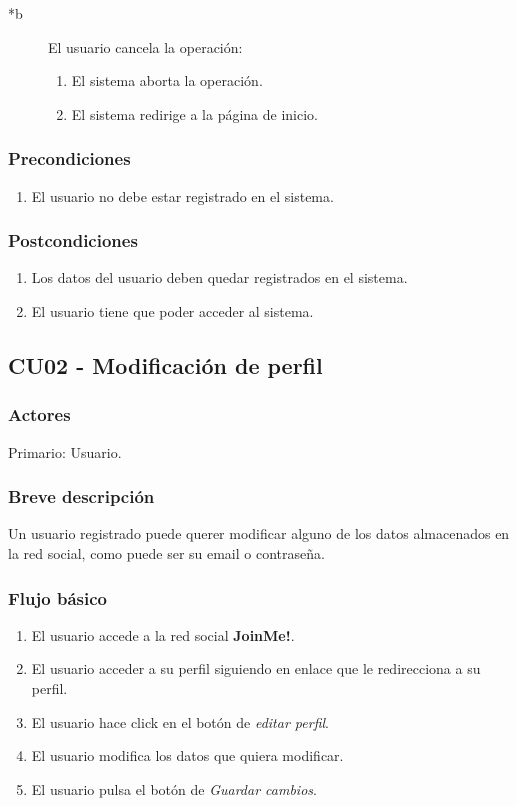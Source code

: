 \documentclass[12pt, a4paper, titlepage]{article}
\begin{document}
\begin{description}
	\item [*b] El usuario cancela la operación:
	\begin{enumerate}
		\item El sistema aborta la operación.
		\item El sistema redirige a la página de inicio.
	\end{enumerate}
\end{description}

\subsubsection{Precondiciones}
\begin{enumerate}
	\item El usuario no debe estar registrado en el sistema.
\end{enumerate}
\subsubsection{Postcondiciones}
\begin{enumerate}
	\item Los datos del usuario deben quedar registrados en el sistema.
	\item El usuario tiene que poder acceder al sistema.
\end{enumerate}


\subsection{CU02 - Modificación de perfil}
\subsubsection{Actores}

Primario: Usuario.

\subsubsection{Breve descripción}
Un usuario registrado puede querer modificar alguno de los datos almacenados en la red social, como puede ser su email o contraseña.

\subsubsection{Flujo básico}
	\begin{enumerate}
		\item El usuario accede a la red social \textbf{JoinMe!}.
		\item El usuario acceder a su perfil siguiendo en enlace que le redirecciona a su perfil. 
		\item El usuario hace click en el botón de \textit{editar perfil}.
		\item El usuario modifica los datos que quiera modificar.
		\item El usuario pulsa el botón de \textit{Guardar cambios}.
	\end{enumerate}
\end{document}
